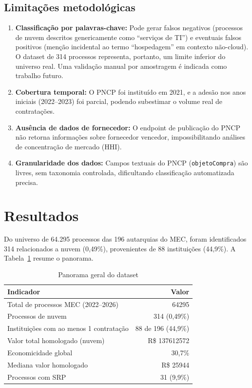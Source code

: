 \documentclass[12pt]{article}
\begin{document}
\subsection{Limitações metodológicas}

\begin{enumerate}
\item \textbf{Classificação por palavras-chave:} Pode gerar falsos negativos (processos de nuvem descritos genericamente como ``serviços de TI'') e eventuais falsos positivos (menção incidental ao termo ``hospedagem'' em contexto não-cloud). O dataset de 314 processos representa, portanto, um limite inferior do universo real. Uma validação manual por amostragem é indicada como trabalho futuro.
\item \textbf{Cobertura temporal:} O PNCP foi instituído em 2021, e a adesão nos anos iniciais (2022--2023) foi parcial, podendo subestimar o volume real de contratações.
\item \textbf{Ausência de dados de fornecedor:} O endpoint de publicação do PNCP não retorna informações sobre fornecedor vencedor, impossibilitando análises de concentração de mercado (HHI).
\item \textbf{Granularidade dos dados:} Campos textuais do PNCP (\texttt{objetoCompra}) são livres, sem taxonomia controlada, dificultando classificação automatizada precisa.
\end{enumerate}

\section{Resultados}
\label{sec:resultados}

Do universo de 64.295 processos das 196 autarquias do MEC, foram identificados 314 relacionados a nuvem (0,49\%), provenientes de 88 instituições (44,9\%). A Tabela~\ref{tab:visao} resume o panorama.

\begin{table}[ht]
\centering
\caption{Panorama geral do dataset}
\label{tab:visao}
\begin{tabular}{lr}
\toprule
\textbf{Indicador} & \textbf{Valor} \\
\midrule
Total de processos MEC (2022--2026) & \num{64295} \\
Processos de nuvem & 314 (0,49\%) \\
Instituições com ao menos 1 contratação & 88 de 196 (44,9\%) \\
Valor total homologado (nuvem) & R\$ \num{137612572} \\
Economicidade global & 30,7\% \\
Mediana valor homologado & R\$ \num{25944} \\
Processos com SRP & 31 (9,9\%) \\
\bottomrule
\end{tabular}
\end{table}
\end{document}
